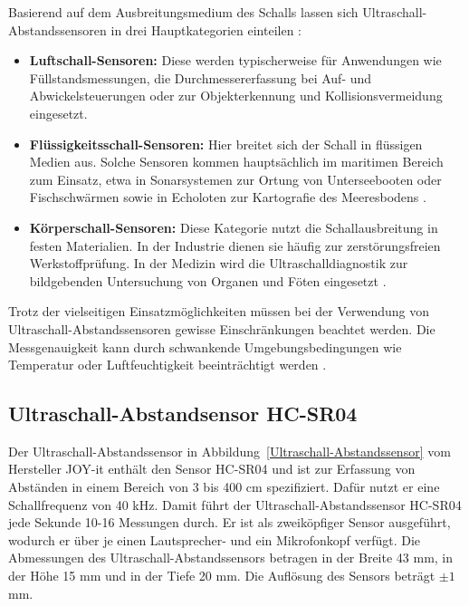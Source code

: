 Basierend auf dem Ausbreitungsmedium des Schalls lassen sich Ultraschall-Abstandssensoren in drei Hauptkategorien einteilen \cite{Hering:2023}:

\begin{itemize}
	\item \textbf{Luftschall-Sensoren:} Diese werden typischerweise für Anwendungen wie Füllstandsmessungen, die Durchmessererfassung bei Auf- und Abwickelsteuerungen oder zur Objekterkennung und Kollisionsvermeidung eingesetzt.
	
	\item \textbf{Flüssigkeitsschall-Sensoren:} Hier breitet sich der Schall in flüssigen Medien aus. Solche Sensoren kommen hauptsächlich im maritimen Bereich zum Einsatz, etwa in Sonarsystemen zur Ortung von Unterseebooten oder Fischschwärmen sowie in Echoloten zur Kartografie des Meeresbodens \cite{Hering:2021b}.
	
	\item \textbf{Körperschall-Sensoren:} Diese Kategorie nutzt die Schallausbreitung in festen Materialien. In der Industrie dienen sie häufig zur zerstörungsfreien Werkstoffprüfung. In der Medizin wird die Ultraschalldiagnostik zur bildgebenden Untersuchung von Organen und Föten eingesetzt \cite{Hering:2021b}.
\end{itemize}

Trotz der vielseitigen Einsatzmöglichkeiten müssen bei der Verwendung von Ultraschall-Abstandssensoren gewisse Einschränkungen beachtet werden. Die Messgenauigkeit kann durch schwankende Umgebungsbedingungen wie Temperatur oder Luftfeuchtigkeit beeinträchtigt werden \cite{ifm:2025}.

\subsection{Ultraschall-Abstandsensor HC-SR04}

Der Ultraschall-Abstandssensor in Abbildung~\ref{Ultraschall-Abstandssensor} vom Hersteller JOY-it enthält den Sensor HC-SR04 und ist zur Erfassung von Abständen in einem Bereich von 3 bis 400 cm spezifiziert. Dafür nutzt er eine Schallfrequenz von 40 kHz. Damit führt der Ultraschall-Abstandssensor HC-SR04 jede Sekunde 10-16 Messungen durch. Er ist als zweiköpfiger Sensor ausgeführt, wodurch er über je einen Lautsprecher- und ein Mikrofonkopf verfügt.  Die Abmessungen des Ultraschall-Abstandssensors betragen in der Breite 43 mm, in der Höhe 15 mm und in der Tiefe 20 mm. Die Auflösung des Sensors beträgt $\pm 1$ mm.


